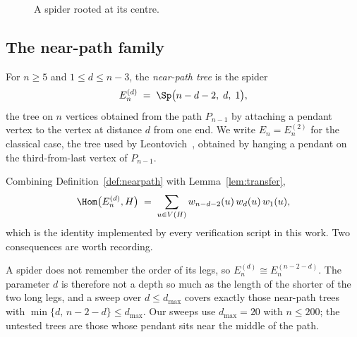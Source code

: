 \begin{figure}[H]
  \centering
  \caption{A spider rooted at its centre.}
  \label{fig:spider-lemma}
\end{figure}

\subsection{The near-path family}

\begin{definition}
  \label{def:nearpath}
  For $n \ge 5$ and $1 \le d \le n-3$, the \emph{near-path tree} is the
  spider
  \[
    E_n^{(d)} \;=\; \Sp\bigl(n-d-2,\; d,\; 1\bigr),
  \]
  the tree on $n$ vertices obtained from the path $P_{n-1}$ by attaching
  a pendant vertex to the vertex at distance $d$ from one end. We write
  $E_n = E_n^{(2)}$ for the classical case, the tree used by
  Leontovich~\cite{leontovich1989}, obtained by hanging a pendant on the
  third-from-last vertex of $P_{n-1}$.
\end{definition}

Combining Definition~\ref{def:nearpath} with Lemma~\ref{lem:transfer},
\begin{equation}
  \label{eq:nearpath-count}
  \Hom\bigl(E_n^{(d)}, H\bigr)
    \;=\; \sum_{u \in V(H)} w_{n-d-2}(u)\, w_{d}(u)\, w_{1}(u),
\end{equation}
which is the identity implemented by every verification script in this
work. Two consequences are worth recording.

\begin{remark}
  \label{rem:d-symmetry}
  A spider does not remember the order of its legs, so
  $E_n^{(d)} \cong E_n^{(n-2-d)}$. The parameter $d$ is therefore not a
  depth so much as the length of the shorter of the two long legs, and a
  sweep over $d \le d_{\max}$ covers exactly those near-path trees with
  $\min\{d,\, n-2-d\} \le d_{\max}$. Our sweeps use
  $d_{\max} = 20$ with $n \le 200$; the untested trees are those whose
  pendant sits near the middle of the path.
\end{remark}


